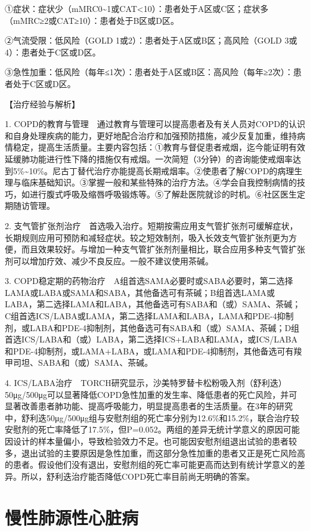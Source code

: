 ①症状：症状少（mMRC0\textasciitilde{}1或CAT\textless{}10）：患者处于A区或C区；症状多（mMRC≥2或CAT≥10）：患者处于B区或D区。

②气流受限：低风险（GOLD 1或2）：患者处于A区或B区；高风险（GOLD
3或4）：患者处于C区或D区。

③急性加重：低风险（每年≤1次）：患者处于A区或B区：高风险（每年≥2次）：患者处于C区或D区。

【治疗经验与解析】

1.
COPD的教育与管理　通过教育与管理可以提高患者及有关人员对COPD的认识和自身处理疾病的能力，更好地配合治疗和加强预防措施，减少反复加重，维持病情稳定，提高生活质量。主要内容包括：①教育与督促患者戒烟，迄今能证明有效延缓肺功能进行性下降的措施仅有戒烟。一次简短（3分钟）的咨询能使戒烟率达到5\%\textasciitilde{}10\%。尼古丁替代治疗亦能提高长期戒烟率。②使患者了解COPD的病理生理与临床基础知识。③掌握一般和某些特殊的治疗方法。④学会自我控制病情的技巧，如进行腹式呼吸及缩唇呼吸锻炼等。⑤了解赴医院就诊的时机。⑥社区医生定期随访管理。

2.
支气管扩张剂治疗　首选吸入治疗。短期按需应用支气管扩张剂可缓解症状，长期规则应用可预防和减轻症状。较之短效制剂，吸入长效支气管扩张剂更为方便，而且效果较好。与增加一种支气管扩张剂剂量相比，联合应用多种支气管扩张剂可以增加疗效、减少不良反应。一般不建议使用茶碱。

3.
COPD稳定期的药物治疗　A组首选SAMA必要时或SABA必要时，第二选择LAMA或LABA或SAMA和SABA，其他备选可有茶碱；B组首选LAMA或LABA，第二选择LAMA和LABA，其他备选可有SABA和（或）SAMA、茶碱；C组首选ICS/LABA或LAMA，第二选择LAMA和LABA，LAMA和PDE-4抑制剂，或LABA和PDE-4抑制剂，其他备选可有SABA和（或）SAMA、茶碱；D组首选ICS/LABA和（或）LABA，第二选择ICS+LABA和LAMA，或ICS/LABA和PDE-4抑制剂，或LAMA+LABA，或LAMA和PDE-4抑制剂，其他备选可有羧甲司坦、SABA和（或）SAMA、茶碱。

4.
ICS/LABA治疗　TORCH研究显示，沙美特罗替卡松粉吸入剂（舒利迭）50μg/500μg可以显著降低COPD急性加重的发生率、降低患者的死亡风险，并可显著改善患者肺功能、提高呼吸能力，明显提高患者的生活质量。在3年的研究中，舒利迭50μg/500μg组与安慰剂组的死亡率分别为12.6\%和15.2\%，联合治疗较安慰剂的死亡率降低了17.5\%，但P=0.052。两组的差异无统计学意义的原因可能因设计的样本量偏小，导致检验效力不足。也可能因安慰剂组退出试验的患者较多，退出试验的主要原因是急性加重，而这部分急性加重的患者又正是死亡风险高的患者。假设他们没有退出，安慰剂组的死亡率可能更高而达到有统计学意义的差异。所以，舒利迭治疗能否降低COPD死亡率目前尚无明确的答案。

\section{慢性肺源性心脏病}

